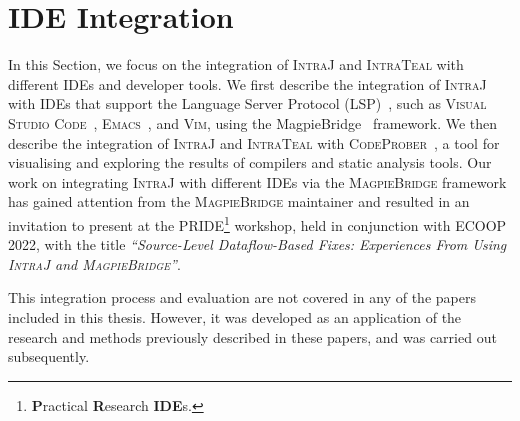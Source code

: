 \section{IDE Integration}
\label{sec:IDEIntegration}
In this Section, we focus on the integration of \textsc{IntraJ} and \textsc{IntraTeal} with different
IDEs and developer tools. We first describe the integration of \textsc{IntraJ} with
IDEs that support the Language Server Protocol (LSP)~\cite{lsp}, such as
\textsc{Visual Studio Code}~\cite{vscode}, \textsc{Emacs}~\cite{emacs}, and \textsc{Vim}\cite{vim}, using
the MagpieBridge~\cite{luo_et_al:LIPIcs:2019:10813} framework. We then describe the
integration of \textsc{IntraJ} and \textsc{IntraTeal} with \textsc{CodeProber}~\cite{risberg2022property},
a tool for visualising and exploring the results of compilers and static analysis tools.
Our work on integrating \textsc{IntraJ} with different IDEs via the \textsc{MagpieBridge}
framework has gained attention from the \textsc{MagpieBridge} maintainer and resulted in an invitation
to present at the \textsc{PRIDE}\footnote{\textbf{P}ractical \textbf{R}esearch \textbf{IDE}s.} workshop, held in conjunction with \textsc{ECOOP 2022}, with the
title \emph{``Source-Level Dataflow-Based Fixes: Experiences From Using \textsc{IntraJ} and \textsc{MagpieBridge}''}.

This integration process and evaluation are not covered in any of the papers included in this thesis.
However, it was developed as an application of the research and methods previously
described in these papers, and was carried out subsequently.

